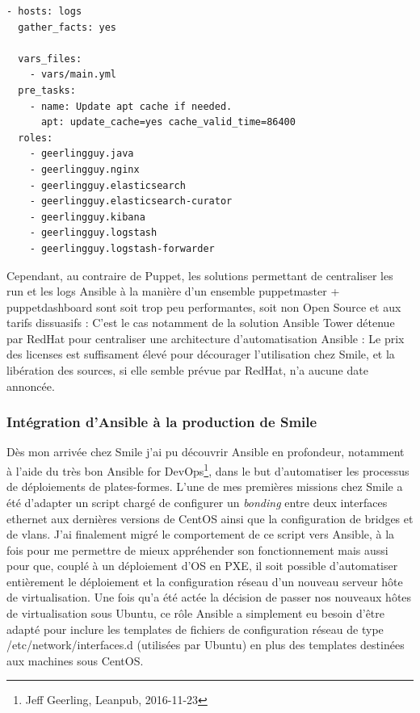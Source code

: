 \documentclass[14 pt]{extreport}
\begin{document}
\begin{framed}
\begin{Verbatim}[fontsize=\scriptsize]
- hosts: logs
  gather_facts: yes
  
  vars_files:
    - vars/main.yml
  pre_tasks:
    - name: Update apt cache if needed.
	  apt: update_cache=yes cache_valid_time=86400
  roles:
    - geerlingguy.java
	- geerlingguy.nginx
	- geerlingguy.elasticsearch
	- geerlingguy.elasticsearch-curator
	- geerlingguy.kibana
	- geerlingguy.logstash
	- geerlingguy.logstash-forwarder
\end{Verbatim}
\end{framed}

Cependant, au contraire de Puppet, les solutions permettant de centraliser les run et les logs Ansible à la manière d'un ensemble puppetmaster + puppetdashboard sont soit trop peu performantes, soit non Open Source et aux tarifs dissuasifs : C'est le cas notamment de la solution Ansible Tower détenue par RedHat pour centraliser une architecture d'automatisation Ansible : Le prix des licenses est suffisament élevé pour décourager l'utilisation chez Smile, et la libération des sources, si elle semble prévue par RedHat, n'a aucune date annoncée.

\subsubsection{Intégration d'Ansible à la production de Smile}

Dès mon arrivée chez Smile j'ai pu découvrir Ansible en profondeur, notamment à l'aide du très bon Ansible for DevOps\footnote{Jeff Geerling, Leanpub, 2016-11-23}, dans le but d'automatiser les processus de déploiements de plates-formes. L'une de mes premières missions chez Smile a été d'adapter un script chargé de configurer un \emph{bonding} entre deux interfaces ethernet aux dernières versions de CentOS ainsi que la configuration de bridges et de vlans. J'ai finalement migré le comportement de ce script vers Ansible, à la fois pour me permettre de mieux appréhender son fonctionnement mais aussi pour que, couplé à un déploiement d'OS en PXE, il soit possible d'automatiser entièrement le déploiement et la configuration réseau d'un nouveau serveur hôte de virtualisation. Une fois qu'a été actée la décision de passer nos nouveaux hôtes de virtualisation sous Ubuntu, ce rôle Ansible a simplement eu besoin d'être adapté pour inclure les templates de fichiers de configuration réseau de type /etc/network/interfaces.d (utilisées par Ubuntu) en plus des templates destinées aux machines sous CentOS.
\end{document}
